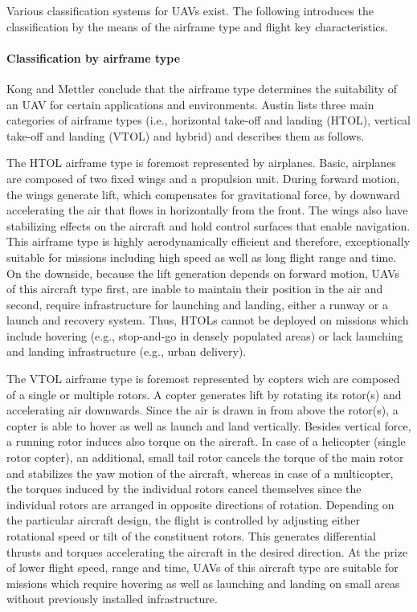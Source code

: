 Various classification systems for UAVs exist.
The following introduces the classification by the means of the airframe type and flight key characteristics.


\paragraph{Classification by airframe type}

Kong and Mettler \cite{Kong2010} conclude that the airframe type determines the suitability of an UAV for certain applications and environments.
Austin \cite{Austin2011} lists three main categories of airframe types
(i.e., horizontal take-off and landing (HTOL), vertical take-off and landing (VTOL) and hybrid)
and describes them as follows.

The HTOL airframe type is foremost represented by airplanes.
Basic, airplanes are composed of two fixed wings and a propulsion unit.
During forward motion, the wings generate lift, which compensates for gravitational force, by downward accelerating the air that flows in horizontally from the front.
The wings also have stabilizing effects on the aircraft and hold control surfaces that enable navigation.
This airframe type is highly aerodynamically efficient and therefore, exceptionally suitable for missions including high speed as well as long flight range and time.
On the downside, because the lift generation depends on forward motion, UAVs of this aircraft type first, are inable to maintain their position in the air 
and second, require infrastructure for launching and landing, either a runway or a launch and recovery system. \cite{Gleason2010}
Thus, HTOLs cannot be deployed on missions which include hovering (e.g., stop-and-go in densely populated areas) 
or lack launching and landing infrastructure (e.g., urban delivery).

The VTOL airframe type is foremost represented by copters wich are composed of a single or multiple rotors.
A copter generates lift by rotating its rotor(s) and accelerating air downwards.
Since the air is drawn in from above the rotor(s), a copter is able to hover as well as launch and land vertically.
Besides vertical force, a running rotor induces also torque on the aircraft.
In case of a helicopter (single rotor copter), an additional, small tail rotor cancels the torque of the main rotor and stabilizes the yaw motion of the aircraft,
whereas in case of a multicopter, the torques induced by the individual rotors cancel themselves since the individual rotors are arranged in opposite directions of rotation.
Depending on the particular aircraft design, the flight is controlled by adjusting either rotational speed or tilt of the constituent rotors.
This generates differential thrusts and torques accelerating the aircraft in the desired direction.
At the prize of lower flight speed, range and time, UAVs of this aircraft type are suitable for missions which
require hovering as well as launching and landing on small areas without previously installed infrastructure.

